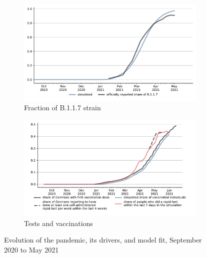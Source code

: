 \begin{figure}[!tp]
\begin{subfigure}[b]{0.475\textwidth}
        \includegraphics[width=\textwidth]{../figures/results/figures/scenario_comparisons/combined_fit/full_share_b117}

        \caption{Fraction of B.1.1.7 strain}
        \label{fig:share_b117}
    \end{subfigure}
    \hfill
    \begin{subfigure}[b]{0.475\textwidth}
        \centering

        \includegraphics[width=\textwidth]{../figures/results/figures/scenario_comparisons/combined_fit/full_share_rapid_test_in_last_week_and_vaccinated}

        \caption{{Tests and vaccinations}}
        \label{fig:antigen_tests_vaccinations}
    \end{subfigure}

    \caption{Evolution of the pandemic, its drivers, and model fit, September 2020 to May 2021}
    \label{fig:pandemic_drivers_model_fit}


\end{figure}
